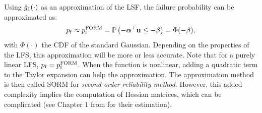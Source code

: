 Using $\check{g}_1(\cdot)$ as an approximation of the LSF, the failure probability can be approximated as: 
\begin{equation}
    p_\mathrm{f} \approx p_\mathrm{f}^{\mathrm{FORM}} = \mathbb{P}\left(- {\boldsymbol{\alpha}}^\top {\bf u} \leq -\beta\right) = \Phi(-\beta),
\end{equation} 
with $\Phi(\cdot)$ the CDF of the standard Gaussian. 
Depending on the properties of the LFS, this approximation will be more or less accurate. 
Note that for a purely linear LFS, $p_\mathrm{f} = p_\mathrm{f}^{\mathrm{FORM}}$. 
When the function is nonlinear, adding a quadratic term to the Taylor expansion can help the approximation. 
The approximation method is then called SORM for \textit{second order reliability method}. 
However, this added complexity implies the computation of Hessian matrices, which can be complicated (see Chapter 1 from \citealp{bourinet_2018} for their estimation).


